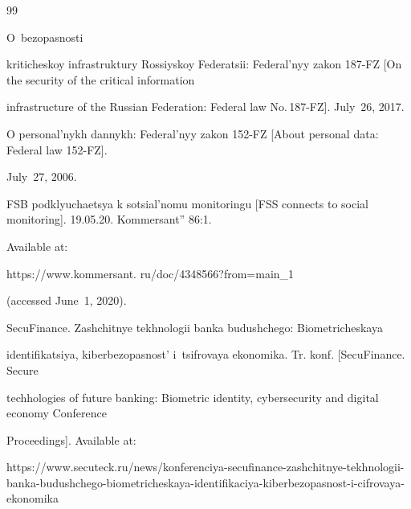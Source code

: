 





\vspace*{-12pt}





\renewcommand{\bibname}{\protect\rmfamily References}







{\small\frenchspacing


{%




\begin{thebibliography}{99}




 O~bezopasnosti 


kriticheskoy infrastruktury Rossiyskoy Federatsii: Federal'nyy zakon 187-FZ [On the security of the critical information 


infrastructure of the Russian Federation: Federal law No.\,187-FZ]. July~26, 2017.







O personal'nykh dannykh: Federal'nyy zakon 152-FZ [About personal data: Federal law 152-FZ]. 


July~27, 2006.




FSB podklyuchaetsya k sotsial'nomu monitoringu [FSS connects to social monitoring]. 19.05.20. Kommersant'' 86:1.


Available at: {\sf 


https://www.kommersant. ru/doc/4348566?from=main\_1} (accessed June~1, 2020).




SecuFinance. Zashchitnye tekhnologii banka budushchego: Bio\-met\-ri\-che\-skaya 


identifikatsiya, kiberbezopasnost' i~tsifrovaya ekonomika. Tr. konf. [SecuFinance. Secure 


techhologies of future banking: Biometric identity, cybersecurity and digital economy Conference


Proceedings]. Available at: {\sf 


https://www.secuteck.\linebreak ru/news/konferenciya-secufinance-zashchitnye-tekhnologii-banka-budushchego-biometricheskaya-identifikaciya-kiberbezopasnost-i-cifrovaya-ekonomika} 



\end{thebibliography}}}
